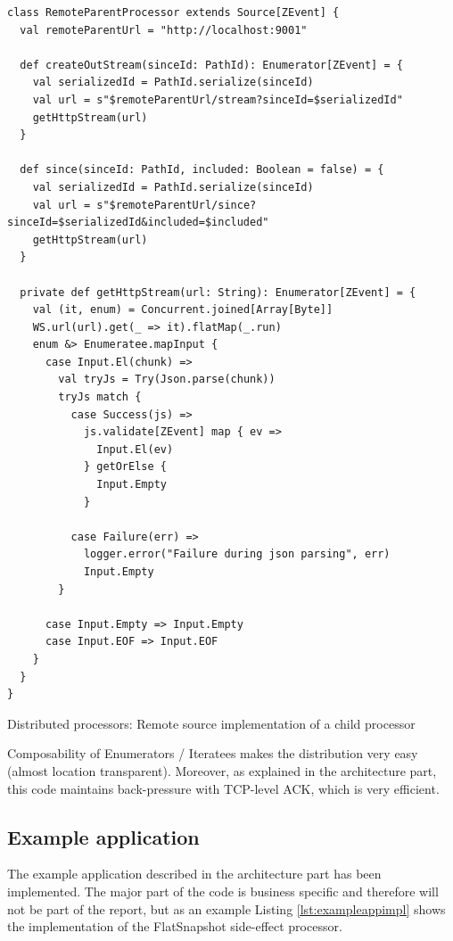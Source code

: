 \begin{listing}[h]
\begin{verbatim}
class RemoteParentProcessor extends Source[ZEvent] {
  val remoteParentUrl = "http://localhost:9001"

  def createOutStream(sinceId: PathId): Enumerator[ZEvent] = {
    val serializedId = PathId.serialize(sinceId)
    val url = s"$remoteParentUrl/stream?sinceId=$serializedId"
    getHttpStream(url)
  }

  def since(sinceId: PathId, included: Boolean = false) = {
    val serializedId = PathId.serialize(sinceId)
    val url = s"$remoteParentUrl/since?sinceId=$serializedId&included=$included"
    getHttpStream(url)
  }

  private def getHttpStream(url: String): Enumerator[ZEvent] = {
    val (it, enum) = Concurrent.joined[Array[Byte]]
    WS.url(url).get(_ => it).flatMap(_.run)
    enum &> Enumeratee.mapInput {
      case Input.El(chunk) =>
        val tryJs = Try(Json.parse(chunk))
        tryJs match {
          case Success(js) =>
            js.validate[ZEvent] map { ev =>
              Input.El(ev)
            } getOrElse {
              Input.Empty
            }

          case Failure(err) =>
            logger.error("Failure during json parsing", err)
            Input.Empty
        }

      case Input.Empty => Input.Empty
      case Input.EOF => Input.EOF
    }
  }
}
\end{verbatim}
\caption{Distributed processors: Remote source implementation of a child processor}
\label{lst:remotechild}
\end{listing}

Composability of Enumerators / Iteratees makes the distribution very easy (almost location transparent). Moreover, as explained in the architecture part, this code maintains
back-pressure with TCP-level ACK, which is very efficient.


\subsection{Example application}

The example application described in the architecture part has been implemented. The major part of the code is business specific and therefore will not be part of the report, but as an example Listing \ref{lst:exampleappimpl} shows the implementation of the FlatSnapshot side-effect processor.

